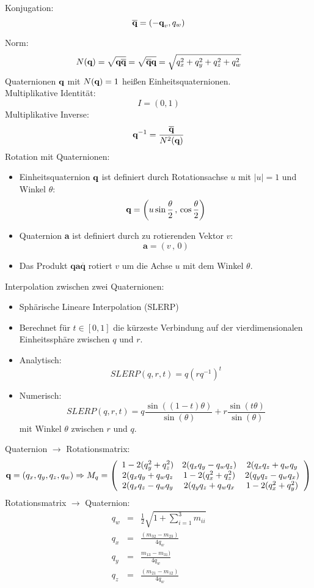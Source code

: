 Konjugation: \[ \overline{\textbf{q}} = (-\textbf{q}_v, q_w)\]

Norm: $$N(\textbf{q}) = \sqrt{\textbf{q} \overline{\textbf{q}}} = \sqrt{\overline{\textbf{q}}\textbf{q}} = \sqrt{q_x^2 + q_y^2 + q_z^2 + q_w^2}$$
Quaternionen $\textbf{q}$ mit $N(\textbf{q}) = 1$ heißen Einheitsquaternionen. \\ Multiplikative Identität: $$I = (0,1)$$ Multiplikative Inverse: $$\textbf{q}^{-1} = \frac{\overline{\textbf{q}}}{N^2(\textbf{q})}$$
Rotation mit Quaternionen:
\begin{itemize}
\item Einheitsquaternion $\textbf{q}$ ist definiert durch Rotationsachse $u$ mit $|u| = 1$ und Winkel $\theta$: $$\textbf{q} = \left( u \sin \frac{\theta}{2} \, , \, \cos \frac{\theta}{2} \right)$$
\item Quaternion \textbf{a} ist definiert durch zu rotierenden Vektor $v$: $$\textbf{a} = (v \, , \, 0)$$
\item Das Produkt $\textbf{qa}\overline{\textbf{q}}$ rotiert $v$ um die Achse $u$ mit dem Winkel $\theta$.
\end{itemize}
Interpolation zwischen zwei Quaternionen:
\begin{itemize}
\item Sphärische Lineare Interpolation (SLERP)
\item Berechnet für $t \in [0,1]$ die kürzeste Verbindung auf der vierdimensionalen Einheitssphäre zwischen $q$ und $r$.
\item Analytisch: $$SLERP(q,r,t) = q(rq^{-1})^t$$
\item Numerisch: $$SLERP(q,r,t) = q \frac{\sin((1-t)\theta)}{\sin(\theta)} + r \frac{\sin(t \theta)}{\sin(\theta)}$$ mit Winkel $\theta$ zwischen $r$ und $q$.
\end{itemize}
Quaternion $\to$ Rotationsmatrix: $$\textbf{q} = (q_x,q_y,q_z,q_w) \Rightarrow M_q = \left( \begin{array}{ccc} 1-2(q_y^2 + q_z^2) & 2(q_xq_y - q_wq_z) & 2(q_xq_z + q_wq_y \\ 2(q_xq_y + q_wq_z & 1-2(q_x^2 + q_z^2) & 2(q_yq_z - q_wq_x) \\ 2(q_xq_z - q_wq_y & 2(q_yq_z + q_wq_x & 1-2(q_x^2 + q_y^2) \end{array} \right)$$
Rotationsmatrix $\to$ Quaternion:
\begin{eqnarray*}
q_w &=& \frac{1}{2} \sqrt{1 + \sum\limits_{i=1}^3 m_{ii}} \\ q_x &=& \frac{(m_{32} - m_{23})}{4q_w} \\ q_y &=& \frac{m_{13} - m_{31})}{4q_w} \\ q_z &=& \frac{(m_{21} - m_{12})}{4q_w}
\end{eqnarray*}

